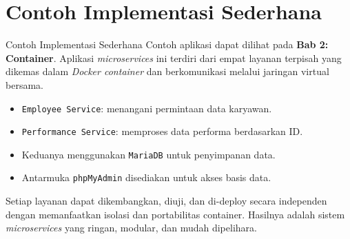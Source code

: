 \documentclass[aspectratio=169, table]{beamer}
\begin{document}
\section{Contoh Implementasi Sederhana}
\begin{frame}[fragile]{Contoh Implementasi Sederhana}
	\vspace{20pt}
	\small
	Contoh aplikasi dapat dilihat pada \textbf{Bab 2: Container}. Aplikasi \textit{microservices} ini terdiri dari empat layanan terpisah yang dikemas dalam \textit{Docker container} dan berkomunikasi melalui jaringan virtual bersama.
	
	\vspace{10pt}
	\begin{itemize}
		\item \texttt{Employee Service}: menangani permintaan data karyawan.
		\item \texttt{Performance Service}: memproses data performa berdasarkan ID.
		\item Keduanya menggunakan \texttt{MariaDB} untuk penyimpanan data.
		\item Antarmuka \texttt{phpMyAdmin} disediakan untuk akses basis data.
	\end{itemize}
	
	\vspace{10pt}
	Setiap layanan dapat dikembangkan, diuji, dan di-deploy secara independen dengan memanfaatkan isolasi dan portabilitas container. Hasilnya adalah sistem \textit{microservices} yang ringan, modular, dan mudah dipelihara.
\end{frame}
\end{document}

